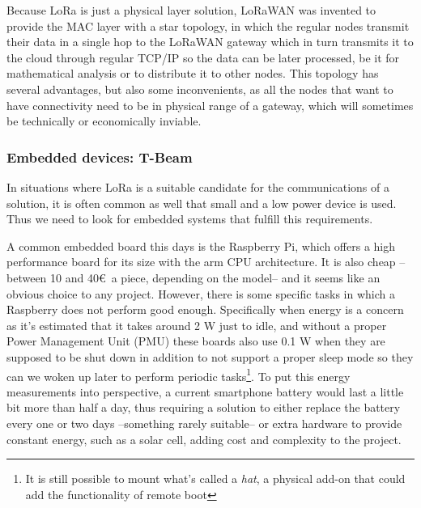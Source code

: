 Because LoRa is just a physical layer solution, LoRaWAN was invented to provide the MAC layer with a star topology, in which the regular nodes transmit their data in a single hop to the LoRaWAN gateway which in turn transmits it to the cloud through regular TCP/IP so the data can be later processed, be it for mathematical analysis or to distribute it to other nodes. This topology has several advantages, but also some inconvenients, as all the nodes that want to have connectivity need to be in physical range of a gateway, which will sometimes be technically or economically inviable.





\subsubsection{Embedded devices: T-Beam}
In situations where LoRa is a suitable candidate for the communications of a solution, it is often common as well that small and a low power device is used. Thus we need to look for embedded systems that fulfill this requirements.

A common embedded board this days is the Raspberry Pi, which offers a high performance board for its size with the arm CPU architecture. It is also cheap –between 10 and 40\euro \ a piece, depending on the model– and it seems like an obvious choice to any project. However, there is some specific tasks in which a Raspberry does not perform good enough. Specifically when energy is a concern as it's estimated that it takes around 2 W\cite{PiConsumption} just to idle, and without a proper Power Management Unit (PMU) these boards also use 0.1 W when they are supposed to be shut down in addition to not support a proper sleep mode so they can we woken up later to perform periodic tasks\footnote{It is still possible to mount what's called a \textit{hat}, a physical add-on that could add the functionality of remote boot}. To put this energy measurements into perspective, a current smartphone battery would last a little bit more than half a day, thus requiring a solution to either replace the battery every one or two days –something rarely suitable– or extra hardware to provide constant energy, such as a solar cell, adding cost and complexity to the project.

